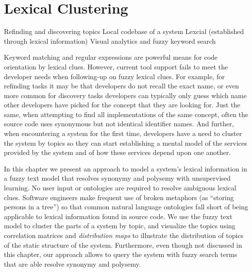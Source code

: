 

\chapter{Lexical Clustering}
\label{the chapter on hapax}

\infobox
	{Refinding and discovering topics}
	{Local codebase of a system}
	{Lexcial (established through lexical information)}
	{Visual analytics and fuzzy keyword search}

Keyword matching and regular expressions are powerful means for code orientation by lexical clues. However, current tool support fails to meet the developer needs when following-up on fuzzy lexical clues. For example, for refinding tasks it may be that developers do not recall the exact name, or even more common for discovery tasks developers can typically only guess which name other developers have picked for the concept that they are looking for. Just the same, when attempting to find all implementations of the same concept, often the source code uses synonymous but not identical identifier names. And further, when encountering a system for the first time, developers have a need to cluster the system by topics so they can start establishing a mental model of the services provided by the system and of how these services depend upon one another. 

In this chapter we present an approach to model a system's lexical information in a fuzzy text model that resolves synonymy and polysemy with unsupervised learning. No user input or ontologies are required to resolve ambiguous lexical clues. Software engineers make frequent use of broken metaphors (as \eg ``storing persons in a tree'') so that common natural language ontologies fall short of being applicable to lexical information found in source code. We use the fuzzy text model to cluster the parts of a system by topic, and visualize the topics using correlation matrices and \emph{distribution maps} to illustrate the distribution of topics of the static structure of the system. Furthermore, even though not discussed in this chapter, our approach allows to query the system with fuzzy search terms that are able resolve synonymy and polysemy.

